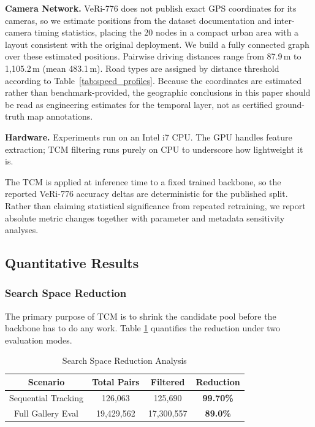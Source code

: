 \documentclass{ijitcs}
\newcommand{\rev}[1]{#1}
\begin{document}
\textbf{Camera Network.} VeRi-776 does not publish exact GPS coordinates for its cameras, so we estimate positions from the dataset documentation and inter-camera timing statistics, placing the 20 nodes in a compact urban area with a layout consistent with the original deployment. We build a fully connected graph over these estimated positions. Pairwise driving distances range from 87.9\,m to 1,105.2\,m (mean 483.1\,m). Road types are assigned by distance threshold according to Table~\ref{tab:speed_profiles}. \rev{Because the coordinates are estimated rather than benchmark-provided, the geographic conclusions in this paper should be read as engineering estimates for the temporal layer, not as certified ground-truth map annotations.}

\textbf{Hardware.} Experiments run on an Intel i7 CPU. The GPU handles feature extraction; TCM filtering runs purely on CPU to underscore how lightweight it is.

\rev{The TCM is applied at inference time to a fixed trained backbone, so the reported VeRi-776 accuracy deltas are deterministic for the published split. Rather than claiming statistical significance from repeated retraining, we report absolute metric changes together with parameter and metadata sensitivity analyses.}

\subsection{Quantitative Results}

\subsubsection{Search Space Reduction}
The primary purpose of TCM is to shrink the candidate pool before the backbone has to do any work. Table \ref{tab:filtering} quantifies the reduction under two evaluation modes.

\begin{table}[htbp]
\caption{Search Space Reduction Analysis}
\begin{center}
\begin{tabular}{cccc}
\toprule
\textbf{Scenario} & \textbf{Total Pairs} & \textbf{Filtered} & \textbf{Reduction} \\
\midrule
Sequential Tracking & 126,063 & 125,690 & \textbf{99.70\%} \\
Full Gallery Eval & 19,429,562 & 17,300,557 & \textbf{89.0\%} \\
\bottomrule
\end{tabular}
\label{tab:filtering}
\end{center}
\end{table}
\end{document}
